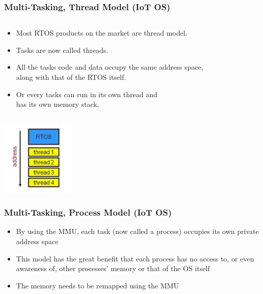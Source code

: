 \documentclass{beamer}
\begin{document}
\begin{frame}
	\frametitle{Multi-Tasking, Thread Model (IoT OS)}
	\begin{columns}[c]
		\begin{column}{30cm}
			\vspace{.1cm}
			\begin{itemize}
				\justifying
				\item Most RTOS products on the market are thread model.
				\item \textcolor{TextGreen}{Tasks} are now called \textcolor{TextGreen}{threads}.
				\item All the \textcolor{TextOrange}{tasks} code and data occupy
				\textcolor{Ocean}{the same address space},\\
				along with that of the RTOS itself.
				\item Or every \textcolor{TextOrange}{tasks} can run in its own thread and \\
				\textcolor{Ocean}{has its own memory stack}.
			\end{itemize}
		\end{column}
	\end{columns}
	\vspace{.5cm}
	\hspace*{5.5cm} \includegraphics[width=3.5cm]{figs/thread-model.jpg}
\end{frame}

\begin{frame}
	\frametitle{Multi-Tasking, Process Model (IoT OS)}
	\begin{itemize}
		\justifying
		\item By using the MMU, each task (now called a process) occupies its own private address space
		\item This model has the great benefit that each process has no access to, or even awareness of, other processes’ memory or that of the OS itself
		\item The memory needs to be remapped using the MMU
	\end{itemize}
\end{frame}
\end{document}
